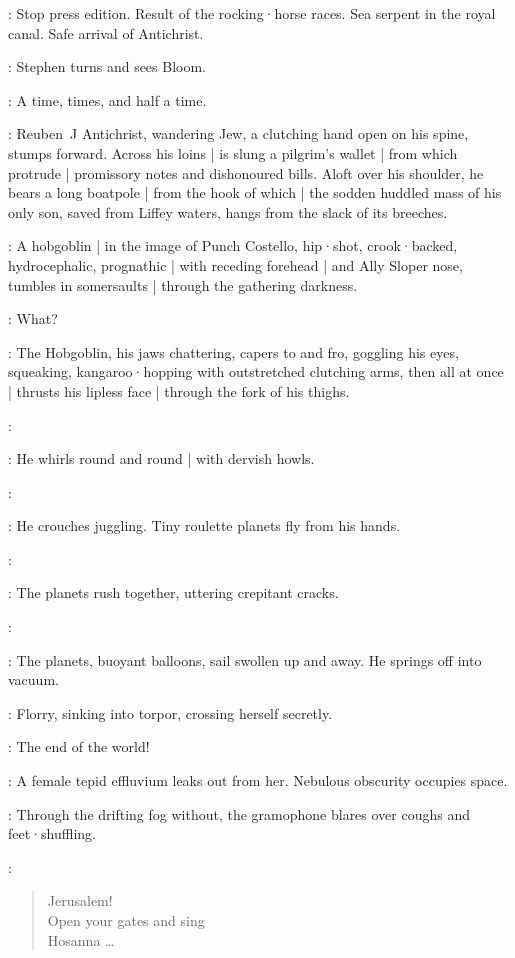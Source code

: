 \Newsboys:
Stop press edition.
Result of the rocking·horse races.
Sea serpent in the royal canal.
Safe arrival of Antichrist.

:
Stephen turns and sees Bloom.

\Stephen:
A time,
times,
and half a time.

:
Reuben~J Antichrist,
wandering Jew,
a clutching hand open on his spine,
stumps forward.
Across his loins |
is slung a pilgrim's wallet |
from which protrude |
promissory notes and dishonoured bills.
Aloft over his shoulder,
he bears a long boatpole |
from the hook of which |
the sodden huddled mass of his only son,
saved from Liffey waters,
hangs from the slack of its breeches.

:
A hobgoblin |
in the image of Punch Costello,
hip·shot,
crook·backed,
hydrocephalic,
prognathic |
with receding forehead |
and Ally Sloper nose,
tumbles in somersaults |
through the gathering darkness.

\All:
What?

:
The Hobgoblin,
his jaws chattering,
capers to and fro,
goggling his eyes,
squeaking,
kangaroo·hopping with outstretched clutching arms,
then all at once |
thrusts his lipless face |
through the fork of his thighs.

\Hobgoblin:

:
He whirls round and round |
with dervish howls.

\Hobgoblin:

:
He crouches juggling.
Tiny roulette planets fly from his hands.

\Hobgoblin:

:
The planets rush together,
uttering crepitant cracks.

\Hobgoblin:

:
The planets,
buoyant balloons,
sail swollen up and away.
He springs off into vacuum.

:
Florry,
sinking into torpor,
crossing herself secretly.

\Florry:
The end of the world!

:
A female tepid effluvium leaks out from her.
Nebulous obscurity occupies space.

:
Through the drifting fog without,
the gramophone blares over coughs and feet·shuffling.

\Gramophone:
\begin{verse}
    Jerusalem!\\
    Open your gates and sing\\
    Hosanna \ldots
\end{verse}

